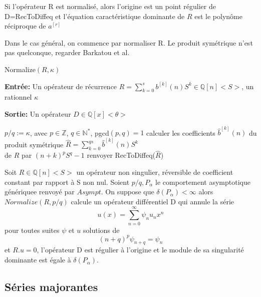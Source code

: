 \documentclass[a4paper,10.5pt]{article}
\begin{document}
	
	\begin{proposition}Si l'opérateur R est normalisé, alors l'origine est un point régulier de D=RecToDiffeq et l'équation caractéristique dominante de $R$ est le polynôme réciproque de $a^{[r]}$ 
	\end{proposition}
	
	Dans le cas général, on commence par normaliser R.
	Le produit symétrique n'est pas quelconque, regarder Barkatou et al.
	\begin{algorithm}
		\caption{Normalize$(R,\kappa)$}
		
		\vspace{2mm}
		
		\textbf{Entrée:} Un opérateur de récurrence $R=\sum_{k=0}^{s} b^{[k]}(n)S^{k} \in \mathbb{Q}[n]\big<S\big>$, un rationnel $\kappa$
		
		\textbf{Sortie:} Un opérateur $D \in \mathbb{Q}[x] \big<\theta\big>$ 
		
		\begin{algorithmic}[1]
			\vspace{4mm}
			\STATE $p/q:=\kappa$, avec $p \in \mathbb{Z}$, $q \in \mathbb{N}^{*}$, pgcd$(p,q)=1$
			\vspace{4mm}
			\STATE calculer les coefficients $\hat{b}^{[k]}(n)$ du produit symétrique $\hat{R}=\sum_{k=0}^{qs}\hat{b}^{[k]}(n)S^{k}$\\
			\vspace{2mm}
			de $R$ par $(n+k)^{p}S^{q}-1$
			\vspace{4mm}
			\STATE renvoyer RecToDiffeq($\hat{R}$)
		\end{algorithmic}
		
	\end{algorithm}
	
	
	\begin{proposition}Soit $R \in \mathbb{Q}[n]\big< S\big>$ un opérateur non singulier, réversible de coefficient constant par rapport à S non nul. Soient $p/q, P_{\alpha}$ le comportement asymptotique génériquee renvoyé par $Asympt$. On suppose que $\delta(P_{\alpha})<\infty$ alors $Normalize(R,p/q)$ calcule un opérateur différentiel D qui annule la série 
		\[u(x)=\sum_{n=0}^{\infty} \psi_{n}u_{n}x^{n}\]
		pour toutes suites $\psi$ et $u$ solutions de
		\[(n+q)^{p}\psi_{n+q}=\psi_{n}\]
		et $R.u=0$, l'opérateur D est régulier à l'origine et le module de sa singularité dominante est égale à $\delta(P_{\alpha})$.
	\end{proposition}
	
	\subsection{Séries majorantes}
	
\end{document}
